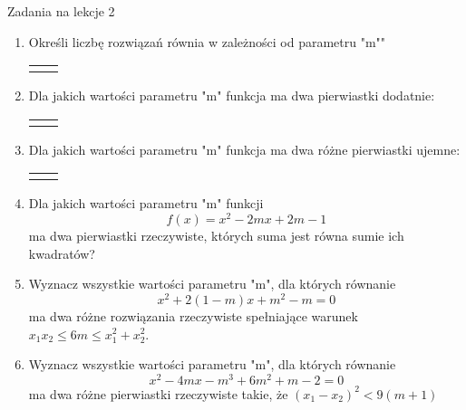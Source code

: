 \documentclass[12pt,a4paper]{article}
\begin{document}
	
	\begin{center}
		\LARGE Zadania na lekcje 2
	\end{center}
	\vspace{1.5cm}
	
	\begin{enumerate}[1.]
		\item Określi liczbę rozwiązań równia w zależności od parametru "m""
		\begin{enumerate}[a)] \begin{tabular}{p{7cm} p{7cm}} 
				\item $(m-3)x^2+(m-2)x+1=0$& \vspace{0.4cm} 	\item $(2m-3)x^2+4mx+m-1=0$ \\
		\end{tabular} \end{enumerate}
	
		\item Dla jakich wartości parametru "m" funkcja ma dwa pierwiastki dodatnie:
		\begin{enumerate}[a)] \begin{tabular}{p{7cm} p{7cm}} 
				\item $f(x)=x^2+2(m-1)x+2m+1$& \vspace{0.4cm} 	\item $f(x)=x^2+(m-5)x+m-2$ \\
		\end{tabular} \end{enumerate}
	
		\item Dla jakich wartości parametru "m" funkcja ma dwa różne pierwiastki ujemne:
		\begin{enumerate}[a)] \begin{tabular}{p{7cm} p{7cm}} 
				\item $f(x)=x^2+5mx+4m^2-3m$& \vspace{0.4cm} 	\item $f(x)=(m-2)x^2-2mx+m^2-3m-4$ \\
		\end{tabular} \end{enumerate}
	
		\item Dla jakich wartości parametru "m" funkcji
		$$f(x)=x^2-2mx+2m-1$$
		ma dwa pierwiastki rzeczywiste, których suma jest równa sumie ich kwadratów?
		
		\item Wyznacz wszystkie wartości parametru "m", dla których równanie
		$$x^2+2(1-m)x+m^2-m=0$$
		ma dwa różne rozwiązania rzeczywiste spełniające warunek $x_1x_2\leq 6m \leq x_1^2+x_2^2 $.
		
		\item Wyznacz wszystkie wartości parametru "m", dla których równanie
		$$x^2-4mx-m^3+6m^2+m-2=0$$
		ma dwa różne pierwiastki rzeczywiste takie, że $(x_1-x_2)^2<9(m+1)$
	\end{enumerate}
	
\end{document}
